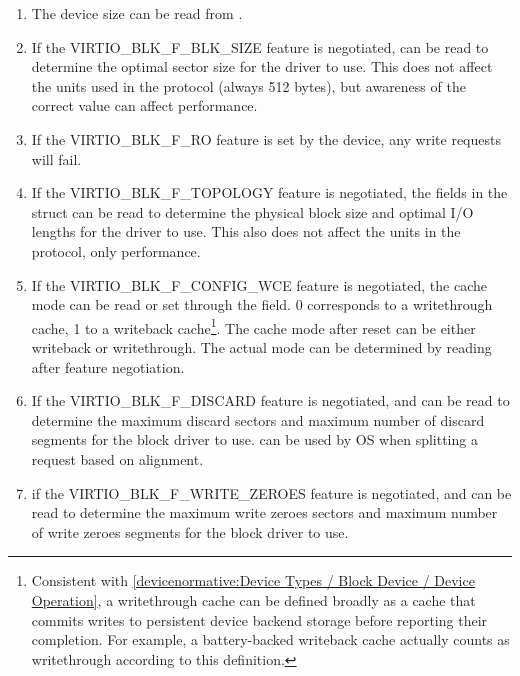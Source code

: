 \begin{enumerate}
\item The device size can be read from .

\item If the VIRTIO_BLK_F_BLK_SIZE feature is negotiated,
   can be read to determine the optimal sector size
  for the driver to use. This does not affect the units used in
  the protocol (always 512 bytes), but awareness of the correct
  value can affect performance.

\item If the VIRTIO_BLK_F_RO feature is set by the device, any write
  requests will fail.

\item If the VIRTIO_BLK_F_TOPOLOGY feature is negotiated, the fields in the
   struct can be read to determine the physical block size and optimal
  I/O lengths for the driver to use. This also does not affect the units
  in the protocol, only performance.

\item If the VIRTIO_BLK_F_CONFIG_WCE feature is negotiated, the cache
  mode can be read or set through the  field.  0 corresponds
  to a writethrough cache, 1 to a writeback cache\footnote{Consistent with
    \ref{devicenormative:Device Types / Block Device / Device Operation},
    a writethrough cache can be defined broadly as a cache that commits
    writes to persistent device backend storage before reporting their
    completion. For example, a battery-backed writeback cache actually
    counts as writethrough according to this definition.}.  The cache mode
  after reset can be either writeback or writethrough.  The actual
  mode can be determined by reading  after feature
  negotiation.

\item If the VIRTIO_BLK_F_DISCARD feature is negotiated,
     and  can be read
    to determine the maximum discard sectors and maximum number of discard
    segments for the block driver to use. 
    can be used by OS when splitting a request based on alignment.

\item if the VIRTIO_BLK_F_WRITE_ZEROES feature is negotiated,
     and  can
    be read to determine the maximum write zeroes sectors and maximum
    number of write zeroes segments for the block driver to use.
\end{enumerate}

